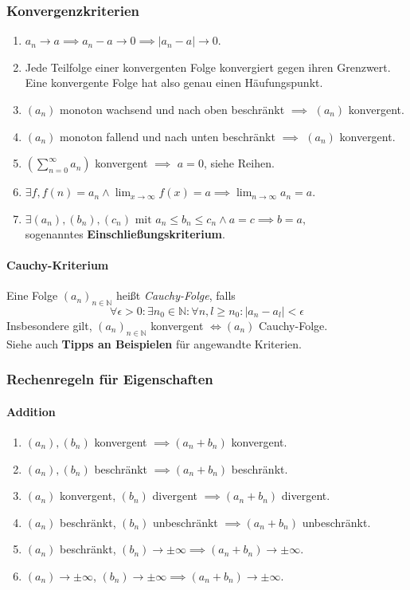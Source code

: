 \documentclass[a4paper, 9pt, DIV=24]{scrartcl}
\newcommand{\N}{\mathbb{N}}
\begin{document}
\subsubsection{Konvergenzkriterien}
\begin{enumerate}[label={(}\arabic*{)}]
\item $a_n \rightarrow a \implies a_n - a \rightarrow 0 \implies |a_n - a| \rightarrow 0$.
\item Jede Teilfolge einer konvergenten Folge konvergiert gegen ihren Grenzwert.
      Eine konvergente Folge hat also genau einen Häufungspunkt.
\item $(a_n)$ monoton wachsend und nach oben beschränkt $\implies$ $(a_n)$ konvergent.
\item $(a_n)$ monoton fallend und nach unten beschränkt $\implies$ $(a_n)$ konvergent.
\item $(\sum_{n=0}^{\infty} a_n)$ konvergent $\implies$ $a = 0$, siehe Reihen.
\item $\exists f, f(n) = a_n \wedge \lim_{x\rightarrow\infty} f(x) = a \implies \lim_{n\rightarrow\infty} a_n = a$.
\item $\exists (a_n), (b_n), (c_n) \text{ mit } a_n \leq b_n \leq c_n \wedge a = c \implies b = a,$\\
      sogenanntes \textbf{Einschließungskriterium}.
\end{enumerate}

\paragraph{Cauchy-Kriterium}
Eine Folge $(a_n)_{n\in\N}$ heißt \emph{Cauchy-Folge}, falls
 \[ \forall \epsilon > 0: \exists n_0 \in\N: \forall n,l \geq n_0: |a_n - a_l| < \epsilon \]
Insbesondere gilt, $(a_n)_{n\in\N}$ konvergent $\iff (a_n)$ Cauchy-Folge.\\[.2em]
Siehe auch \textbf{Tipps an Beispielen} für angewandte Kriterien.

\subsubsection{Rechenregeln für Eigenschaften}
\paragraph{Addition}
\begin{enumerate}[label={(}\arabic*{)}]
 \item $(a_n), (b_n)$ konvergent $\implies (a_n + b_n)$ konvergent.
 \item $(a_n), (b_n)$ beschränkt $\implies (a_n + b_n)$ beschränkt.
 \item $(a_n)$ konvergent, $(b_n)$ divergent $\implies (a_n + b_n)$ divergent.
 \item $(a_n)$ beschränkt, $(b_n)$ unbeschränkt $\implies (a_n + b_n)$ unbeschränkt.
 \item $(a_n)$ beschränkt, $(b_n) \rightarrow \pm \infty \implies (a_n + b_n) \rightarrow \pm \infty$.
 \item $(a_n) \rightarrow \pm\infty$, $(b_n) \rightarrow \pm\infty \implies (a_n + b_n) \rightarrow \pm\infty$.
\end{enumerate}
\end{document}

